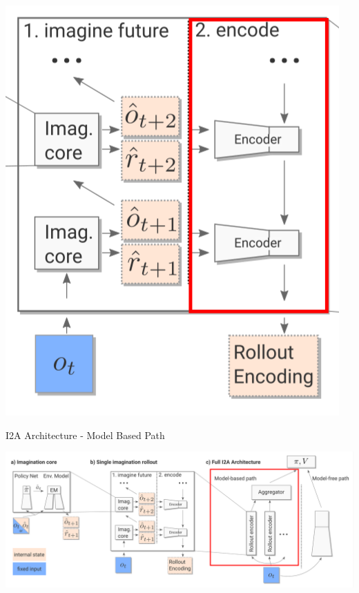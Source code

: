   \begin{center} 
    \includegraphics[height=.2\textheight]{./Images/encoder.png}%
  \end{center} 
 
 
 
I2A Architecture - Model Based Path 
 
 
\includegraphics[width=\columnwidth]{./Images/i2a_all_model_based_path.png}%
 
 
